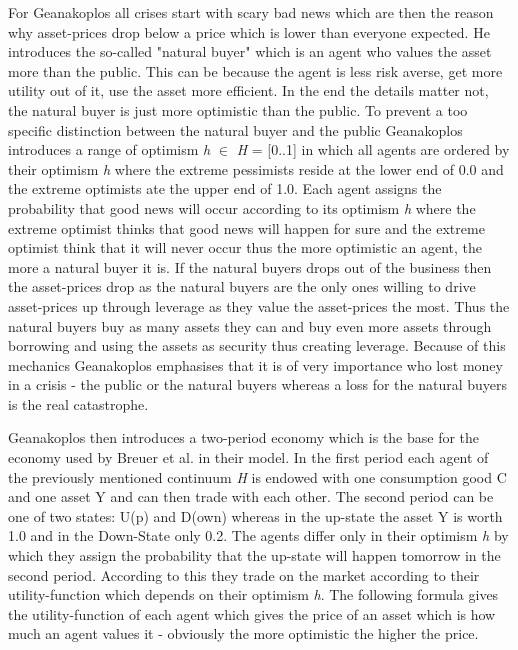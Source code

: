 \documentclass[../Bachelorarbeit.tex]{subfiles}
\begin{document}
For Geanakoplos all crises start with scary bad news which are then the reason why asset-prices drop below a price which is lower than everyone expected. He introduces the so-called "natural buyer" which is an agent who values the asset more than the public. This can be because the agent is less risk averse, get more utility out of it, use the asset more efficient. In the end the details matter not, the natural buyer is just more optimistic than the public.
To prevent a too specific distinction between the natural buyer and the public Geanakoplos introduces a range of optimism \textit{h} $\in$ \textit{H} = [0..1] in which all agents are ordered by their optimism \textit{h} where the extreme pessimists reside at the lower end of 0.0 and the extreme optimists ate the upper end of 1.0. Each agent assigns the probability that good news will occur according to its optimism \textit{h} where the extreme optimist thinks that good news will happen for sure and the extreme optimist think that it will never occur thus the more optimistic an agent, the more a natural buyer it is. If the natural buyers drops out of the business then the asset-prices drop as the natural buyers are the only ones willing to drive asset-prices up through leverage as they value the asset-prices the most. Thus the natural buyers buy as many assets they can and buy even more assets through borrowing and using the assets as security thus creating leverage. Because of this mechanics Geanakoplos emphasises that it is of very importance who lost money in a crisis - the public or the natural buyers whereas a loss for the natural buyers is the real catastrophe.

\medskip
Geanakoplos then introduces a two-period economy which is the base for the economy used by Breuer et al. in their model. In the first period each agent of the previously mentioned continuum \textit{H} is endowed with one consumption good C and one asset Y and can then trade with each other. The second period can be one of two states: U(p) and D(own) whereas in the up-state the asset Y is worth 1.0 and in the Down-State only 0.2. The agents differ only in their optimism \textit{h} by which they assign the probability that the up-state will happen tomorrow in the second period. According to this they trade on the market according to their utility-function which depends on their optimism \textit{h}. The following formula gives the utility-function of each agent which gives the price of an asset which is how much an agent values it - obviously the more optimistic the higher the price.
\end{document}
